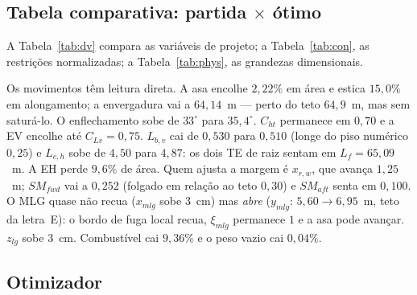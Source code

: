 \subsection{Tabela comparativa: partida $\times$ ótimo}
\label{sec:p3q3}

A Tabela~\ref{tab:dv} compara as variáveis de projeto; a
Tabela~\ref{tab:con}, as restrições normalizadas; a
Tabela~\ref{tab:phys}, as grandezas dimensionais.

\begin{table}[H]
\centering
\caption{Variáveis de projeto --- configuração de PRJ-22 e ótimo.}
\label{tab:dv}
\small

\end{table}

\begin{table}[H]
\centering
\caption{Restrições normalizadas $g(x)\ge 0$. Uma restrição é
classificada como ativa quando $|g|\le 10^{-4}$.}
\label{tab:con}
\scriptsize

\end{table}

\begin{table}[H]
\centering
\caption{Grandezas dimensionais da partida e do ótimo.}
\label{tab:phys}
\small

\end{table}

Os movimentos têm leitura direta. A asa encolhe $2{,}22\%$ em área e
estica $15{,}0\%$ em alongamento; a envergadura vai a $64{,}14$~m --- perto
do teto $64{,}9$~m, mas sem saturá-lo. O enflechamento sobe de $33^\circ$ para $35{,}4^\circ$.
$C_{ht}$ permanece em $0{,}70$ e a EV encolhe até $C_{Lv}=0{,}75$.
$L_{b,v}$ cai de $0{,}530$ para $0{,}510$ (longe do piso numérico $0{,}25$)
e $L_{c,h}$ sobe de $4{,}50$ para $4{,}87$: os dois TE de raiz sentam em
$L_f=65{,}09$~m. A EH perde $9{,}6\%$ de área. Quem ajusta a margem é
$x_{r,w}$, que avança $1{,}25$~m; $SM_{fwd}$ vai a $0{,}252$ (folgado
em relação ao teto $0{,}30$) e $SM_{aft}$ senta em $0{,}100$.
O MLG quase não recua ($x_{mlg}$ sobe $3$~cm) mas \emph{abre}
($y_{mlg}$: $5{,}60\to 6{,}95$~m, teto da letra~E): o bordo de fuga local
recua, $\xi_{mlg}$ permanece $1$ e a asa pode avançar. $z_{lg}$ sobe
$3$~cm. Combustível cai $9{,}36\%$ e o peso vazio cai $0{,}04\%$.

\subsection{Otimizador}
\label{sec:p3q4}

